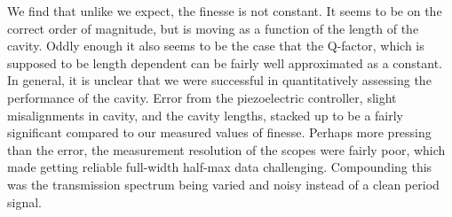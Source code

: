 \documentclass[11pt]{article}
\begin{document}
We find that unlike we expect, the finesse is not constant. It seems to be on the correct order of magnitude, but is moving as a function of the length of the cavity. Oddly enough it also seems to be the case that the Q-factor, which is supposed to be length dependent can be fairly well approximated as a constant. In general, it is unclear that we were successful in quantitatively assessing the performance of the cavity. Error from the piezoelectric controller, slight misalignments in cavity, and the cavity lengths, stacked up to be a fairly significant compared to our measured values of finesse. Perhaps more pressing than the error, the measurement resolution of the scopes were fairly poor, which made getting reliable full-width half-max data challenging. Compounding this was the  transmission spectrum being varied and noisy instead of a clean period signal. 
\end{document}
